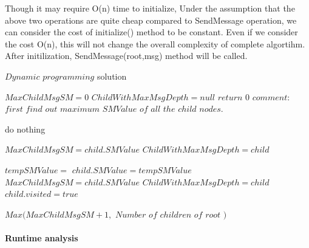 Though it may require O(n) time to initialize, Under the assumption that the above two operations are quite cheap compared to SendMessage operation, we can consider the cost of initialize() method to be constant. Even if we consider the cost O(n), this will not change the overall complexity of complete algortihm. \\

After initilization, SendMessage(root,msg) method will be called. 




\begin{algorithm}
	\caption{$Dynamic $ $programming$ solution}
	\begin{algorithmic}
		\State $ MaxChildMsgSM = 0 $
		\State $ ChildWithMaxMsgDepth = null $
			\State $ return$ $ 0$ 	
		\EndIf
	  	\State 		
		\State $comment: $ $ first $ $ find $ $ out $ $ maximum $ $ SMValue $  $ of $ $ all $ $ the $ $ child $ $ nodes.$		
		
		
		\State 
			\State do nothing
		\Else
		\State		
		
			 \State			 
			 	\State $ MaxChildMsgSM = child.SMValue$
				\State $ ChildWithMaxMsgDepth = child $
			  \EndIf
				\State
	     \EndIf
		     	
	     	\State $tempSMValue =  $ 
	     	\State $child.SMValue = tempSMValue$
			 	\State $ MaxChildMsgSM = child.SMValue$
				\State $ ChildWithMaxMsgDepth = child $
				\State $ child.visited = true $
			\EndIf
		\EndIf		
		\EndIf
			
		\EndFor
		
		
		
		\Return $ Max(MaxChildMsgSM + 1,$ $ Number$ $ of $ $ children $ $ of $ $ root $ $ ) $
			 				
		
		
	  \EndFunction
	
	  
	\end{algorithmic}
\end{algorithm}

\paragraph{Runtime analysis}

